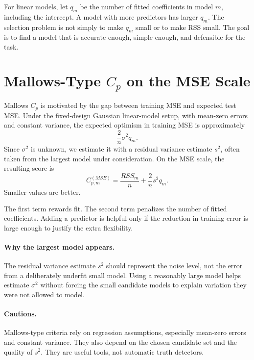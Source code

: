 For linear models, let \(q_m\) be the number of fitted coefficients in model \(m\), including the intercept.  A model with more predictors has larger \(q_m\).  The selection problem is not simply to make \(q_m\) small or to make RSS small.  The goal is to find a model that is accurate enough, simple enough, and defensible for the task.

\section{Mallows-Type \texorpdfstring{\(C_p\)}{Cp} on the MSE Scale}

Mallows \(C_p\) is motivated by the gap between training MSE and expected test MSE.  Under the fixed-design Gaussian linear-model setup, with mean-zero errors and constant variance, the expected optimism in training MSE is approximately
\begin{equation}
  \frac{2}{n}\sigma^2 q_m.
\end{equation}
Since \(\sigma^2\) is unknown, we estimate it with a residual variance estimate \(s^2\), often taken from the largest model under consideration.  On the MSE scale, the resulting score is
\begin{equation}
  \boxed{
  C_{p,m}^{(MSE)}
  =\frac{RSS_m}{n}+\frac{2}{n}s^2 q_m.
  }
  \label{eq:ch15-cp-mse-scale}
\end{equation}
Smaller values are better.

The first term rewards fit.  The second term penalizes the number of fitted coefficients.  Adding a predictor is helpful only if the reduction in training error is large enough to justify the extra flexibility.

\paragraph{Why the largest model appears.}
The residual variance estimate \(s^2\) should represent the noise level, not the error from a deliberately underfit small model.  Using a reasonably large model helps estimate \(\sigma^2\) without forcing the small candidate models to explain variation they were not allowed to model.

\paragraph{Cautions.}
Mallows-type criteria rely on regression assumptions, especially mean-zero errors and constant variance.  They also depend on the chosen candidate set and the quality of \(s^2\).  They are useful tools, not automatic truth detectors.

